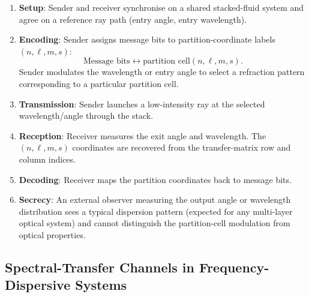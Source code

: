 \documentclass[11pt,twocolumn,a4paper]{article}
\theoremstyle{definition}
\begin{document}
\begin{protocol}
\label{prot:partition}
\begin{enumerate}[nosep]
\item \textbf{Setup}: Sender and receiver synchronise on a shared stacked-fluid system and agree on a reference ray path (entry angle, entry wavelength).

\item \textbf{Encoding}: Sender assigns message bits to partition-coordinate labels $(n, \ell, m, s)$:
\[
\text{Message bits} \leftrightarrow \text{partition cell}(n,\ell,m,s).
\]
Sender modulates the wavelength or entry angle to select a refraction pattern corresponding to a particular partition cell.

\item \textbf{Transmission}: Sender launches a low-intensity ray at the selected wavelength/angle through the stack.

\item \textbf{Reception}: Receiver measures the exit angle and wavelength. The $(n,\ell,m,s)$ coordinates are recovered from the transfer-matrix row and column indices.

\item \textbf{Decoding}: Receiver maps the partition coordinates back to message bits.

\item \textbf{Secrecy}: An external observer measuring the output angle or wavelength distribution sees a typical dispersion pattern (expected for any multi-layer optical system) and cannot distinguish the partition-cell modulation from optical properties.
\end{enumerate}
\end{protocol}

\subsection{Spectral-Transfer Channels in Frequency-Dispersive Systems}
\end{document}
